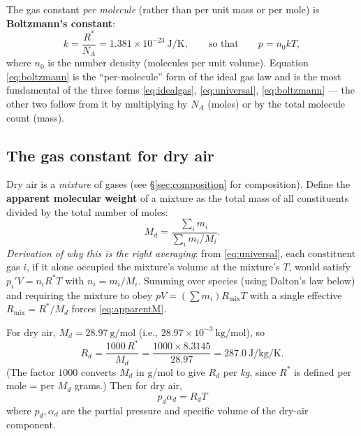\documentclass[11pt]{article}
\newcommand{\Rd}{R_d}
\begin{document}
The gas constant \emph{per molecule} (rather than per unit mass or per mole) is \textbf{Boltzmann's constant}:
\begin{equation}
k = \frac{R^{*}}{N_A} = 1.381\times10^{-23}\ \si{\joule\per\kelvin}, \qquad\text{so that}\qquad p = n_0 k T,
\label{eq:boltzmann}
\end{equation}
where $n_0$ is the number density (molecules per unit volume). Equation \eqref{eq:boltzmann} is the ``per-molecule'' form of the ideal gas law and is the most fundamental of the three forms \eqref{eq:idealgas}, \eqref{eq:universal}, \eqref{eq:boltzmann} — the other two follow from it by multiplying by $N_A$ (moles) or by the total molecule count (mass).

\subsection{The gas constant for dry air}
\label{sec:Rd}

Dry air is a \emph{mixture} of gases (see \S\ref{sec:composition} for composition). Define the \textbf{apparent molecular weight} of a mixture as the total mass of all constituents divided by the total number of moles:
\begin{equation}
M_d = \frac{\sum_i m_i}{\sum_i m_i/M_i}.
\label{eq:apparentM}
\end{equation}
\emph{Derivation of why this is the right averaging}: from \eqref{eq:universal}, each constituent gas $i$, if it alone occupied the mixture's volume at the mixture's $T$, would satisfy $p_i' V = n_i R^* T$ with $n_i = m_i/M_i$. Summing over species (using Dalton's law below) and requiring the mixture to obey $pV = \left(\sum m_i\right) R_{\text{mix}} T$ with a single effective $R_{\text{mix}} = R^*/M_d$ forces \eqref{eq:apparentM}.

For dry air, $M_d = 28.97\ \si{\g\per\mol}$ (i.e., $28.97\times10^{-3}\ \si{\kg\per\mol}$), so
\begin{equation}
\Rd = \frac{1000\,R^{*}}{M_d} = \frac{1000\times 8.3145}{28.97} = 287.0\ \si{\joule\per\kg\per\kelvin}.
\label{eq:Rd}
\end{equation}
(The factor $1000$ converts $M_d$ in g/mol to give $\Rd$ per \emph{kg}, since $R^*$ is defined per mole = per $M_d$ grams.) Then for dry air,
\begin{equation}
p_d \alpha_d = \Rd T
\label{eq:idealgasdry}
\end{equation}
where $p_d,\alpha_d$ are the partial pressure and specific volume of the dry-air component.
\end{document}

